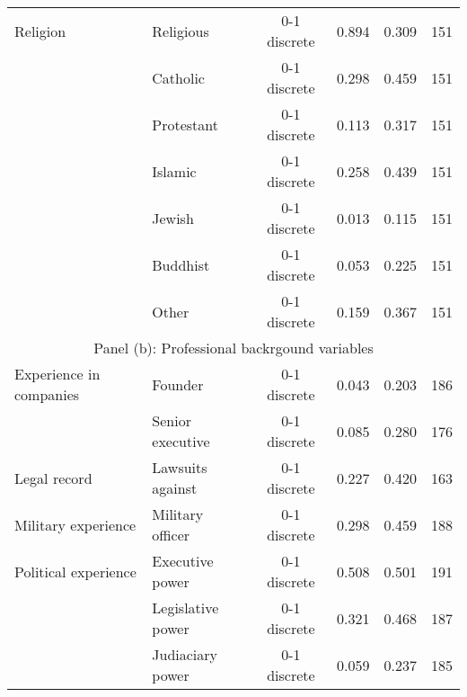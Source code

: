 \begin{table}[h!]
{\begin{threeparttable}
\begin{tabular}{llcccc}
	Religion                & Religious            & 0-1 discrete & 0.894  & 0.309  & 151                                                              \\
	& Catholic             & 0-1 discrete & 0.298  & 0.459  & 151                                                              \\
	& Protestant           & 0-1 discrete & 0.113  & 0.317  & 151                                                              \\
	& Islamic              & 0-1 discrete & 0.258  & 0.439  & 151                                                              \\
	& Jewish               & 0-1 discrete & 0.013  & 0.115  & 151                                                              \\
	& Buddhist             & 0-1 discrete & 0.053  & 0.225  & 151                                                              \\
	& Other                & 0-1 discrete & 0.159  & 0.367  & 151                                                              \\[1ex]
	\multicolumn{6}{c}{Panel (b): Professional backrgound variables}                                                                                         \\[1ex]
	Experience in companies & Founder              & 0-1 discrete & 0.043  & 0.203  & 186                                                              \\
	& Senior executive     & 0-1 discrete & 0.085  & 0.280  & 176                                                              \\[1ex]
	Legal record            & Lawsuits against     & 0-1 discrete & 0.227  & 0.420  & 163                                                              \\[1ex]
	Military experience     & Military officer     & 0-1 discrete & 0.298  & 0.459  & 188                                                              \\[1ex]
	Political experience    & Executive power      & 0-1 discrete & 0.508  & 0.501  & 191                                                              \\
	& Legislative power    & 0-1 discrete & 0.321  & 0.468  & 187                                                              \\
	& Judiaciary power     & 0-1 discrete & 0.059  & 0.237  & 185                                                              \\

\end{tabular}
\end{threeparttable}}
\end{table}
